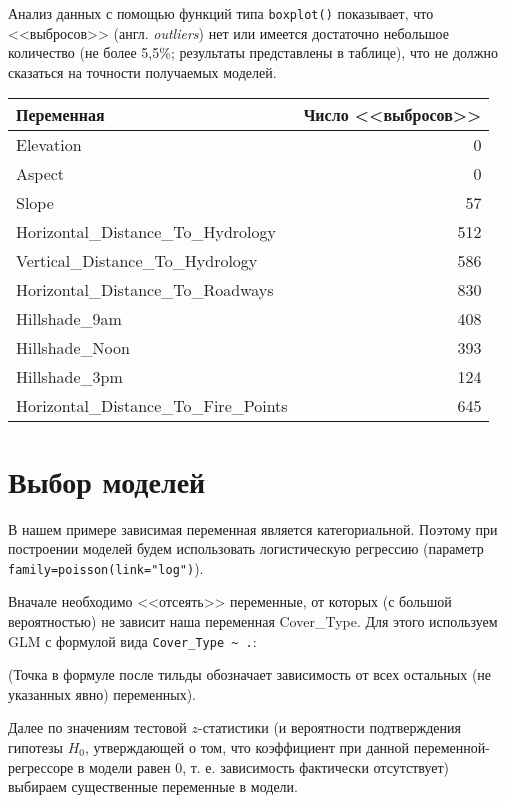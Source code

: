 \documentclass[12pt]{article}
\begin{document}
Анализ данных с помощью функций типа \verb|boxplot()| показывает, что <<выбросов>> (англ. \textit{outliers}) нет или
имеется достаточно небольшое количество (не более 5,5\%; результаты представлены в таблице),
что не должно сказаться на точности получаемых моделей.

\begin{tabular}{|l|r|}
	\hline
	Переменная                   & Число <<выбросов>> \\ \hline
	Elevation                              & 0                               \\
	Aspect                                 & 0                               \\
	Slope                                  & 57                              \\
	Horizontal\_Distance\_To\_Hydrology    & 512                             \\
	Vertical\_Distance\_To\_Hydrology      & 586                             \\
	Horizontal\_Distance\_To\_Roadways     & 830                             \\
	Hillshade\_9am                         & 408                             \\
	Hillshade\_Noon                        & 393                             \\
	Hillshade\_3pm                         & 124                             \\
	Horizontal\_Distance\_To\_Fire\_Points & 645                             \\ \hline
\end{tabular}

\section{Выбор моделей}
В нашем примере зависимая переменная является категориальной. Поэтому при построении моделей будем использовать логистическую
регрессию (параметр \verb|family=poisson(link="log")|).

Вначале необходимо <<отсеять>> переменные, от которых (с большой вероятностью) не зависит наша переменная Cover\_Type. Для этого
используем GLM с формулой вида \verb|Cover_Type ~ .|:

(Точка в формуле после тильды обозначает зависимость от всех остальных (не указанных явно) переменных).

Далее по значениям тестовой $z$-статистики (и вероятности подтверждения гипотезы $H_0$, утверждающей о том, что коэффициент при
данной переменной-регрессоре в модели равен 0, т. е. зависимость фактически отсутствует) выбираем существенные переменные в модели.
\end{document}

